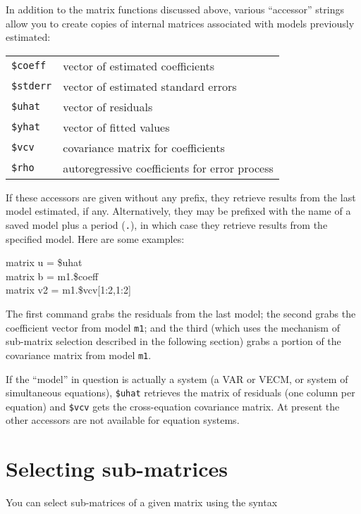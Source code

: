 In addition to the matrix functions discussed above,
various ``accessor'' strings allow you to create copies of internal
matrices associated with models previously estimated:

\begin{center}
\begin{tabular}{ll}
\texttt{\$coeff} & vector of estimated coefficients \\
\texttt{\$stderr} & vector of estimated standard errors \\
\texttt{\$uhat} & vector of residuals \\
\texttt{\$yhat} & vector of fitted values \\
\texttt{\$vcv} & covariance matrix for coefficients \\
\texttt{\$rho} & autoregressive coefficients for error process
\end{tabular}
\end{center}

If these accessors are given without any prefix, they retrieve results
from the last model estimated, if any.  Alternatively, they may be
prefixed with the name of a saved model plus a period (\texttt{.}), in
which case they retrieve results from the specified model.  Here are
some examples:
%
\begin{textcode}
matrix u = \$uhat\\
matrix b = m1.\$coeff\\
matrix v2 = m1.\$vcv[1:2,1:2]
\end{textcode}
%
The first command grabs the residuals from the last model; the second
grabs the coefficient vector from model \texttt{m1}; and the third
(which uses the mechanism of sub-matrix selection described in the
following section) grabs a portion of the covariance matrix from model
\texttt{m1}.

If the ``model'' in question is actually a system (a VAR
or VECM, or system of simultaneous equations), \texttt{\$uhat}
retrieves the matrix of residuals (one column per equation) and
\texttt{\$vcv} gets the cross-equation covariance matrix.  At present
the other accessors are not available for equation systems.


\section{Selecting sub-matrices}
\label{matrix-sub}

You can select sub-matrices of a given matrix using the syntax


